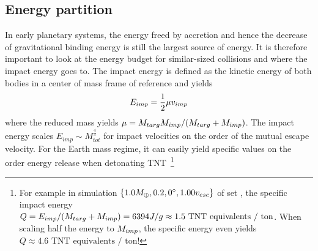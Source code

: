 

\subsection{Energy partition}
In early planetary systems, the energy freed by accretion and hence the decrease of gravitational binding energy is still the largest source of energy. It is therefore important to look at the energy budget for similar-sized collisions and where the impact energy goes to. The impact energy is defined as the kinetic energy of both bodies in a center of mass frame of reference and yields
\begin{align}
E_{imp} = \frac{1}{2} \mu v_{imp}
\end{align}
where the reduced mass yields $\mu = M_{targ} M_{imp} / ( M_{targ} + M_{imp} )$. The impact energy scales $E_{imp} \sim M_{tot}^\frac{4}{3}$ for impact velocities on the order of the mutual escape velocity. For the Earth mass regime, it can easily yield specific values on the order energy release when detonating TNT \footnote{For example in simulation $\{ 1.0 M_{\oplus}, 0.2, 0 ^\circ, 1.00 v_{esc} \}$ of set \css, the specific impact energy $Q = E_{imp} / ( M_{targ} + M_{imp} ) = 6 394 J / g \approx 1.5 \textrm{ TNT equivalents / ton}$. When scaling half the energy to $M_{imp}$, the specific energy even yields $Q \approx 4.6 \textrm{ TNT equivalents / ton}$!}

